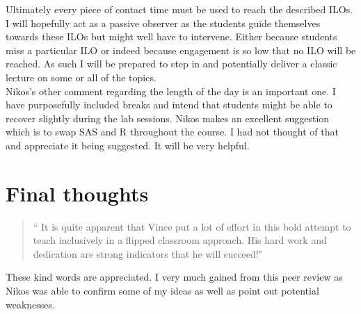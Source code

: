 \documentclass[a4paper,12pt]{article}
\begin{document}
Ultimately every piece of contact time must be used to reach the described ILOs. I will hopefully act as a passive observer as the students guide themselves towards these ILOs but might well have to intervene. Either because students miss a particular ILO or indeed because engagement is so low that no ILO will be reached. As such I will be prepared to step in and potentially deliver a classic lecture on some or all of the topics.\\

Nikos's other comment regarding the length of the day is an important one. I have purposefully included breaks and intend that students might be able to recover slightly during the lab sessions. Nikos makes an excellent suggestion which is to swap SAS and R throughout the course. I had not thought of that and appreciate it being suggested. It will be very helpful.

\section{Final thoughts}

\begin{quote}
`` It is quite apparent that Vince put a lot of effort in this bold attempt to teach inclusively in a flipped classroom approach. His hard work and dedication are strong indicators that he will succeed!"
\end{quote}

These kind words are appreciated. I very much gained from this peer review as Nikos was able to confirm some of my ideas as well as point out potential weaknesses.
\end{document}
